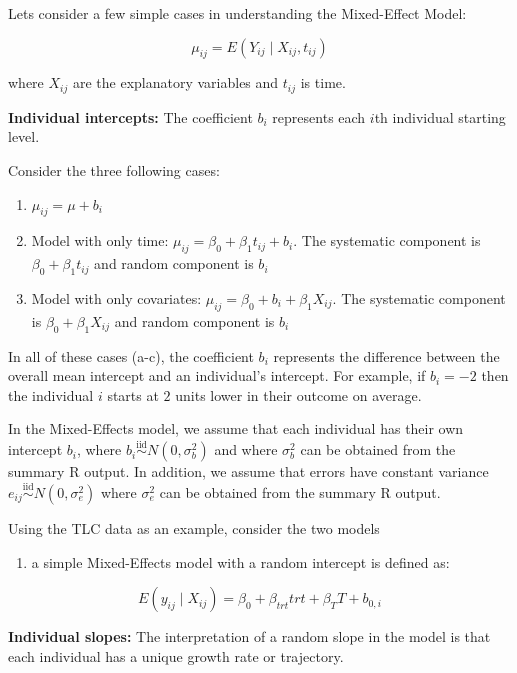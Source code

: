 \documentclass[
  letterpaper,
  DIV=11,
  numbers=noendperiod]{scrreprt}
\providecommand{\tightlist}{%
  \setlength{\itemsep}{0pt}\setlength{\parskip}{0pt}}\usepackage{longtable,booktabs,array}
\begin{document}
Lets consider a few simple cases in understanding the Mixed-Effect
Model:

\[\mu_{ij} = E(Y_{ij} \mid {X_{ij},t_{ij}})\]

where \(X_{ij}\) are the explanatory variables and \(t_{ij}\) is time.

\textbf{Individual intercepts:} The coefficient \(b_i\) represents each
\(i\)th individual starting level.

Consider the three following cases:

\begin{enumerate}
\def\labelenumi{\alph{enumi})}
\item
  \(\mu_{ij} = \mu + b_i\)
\item
  Model with only time: \(\mu_{ij} = \beta_0 + \beta_1 t_{ij} + b_i\).
  The systematic component is \(\beta_0 + \beta_1 t_{ij}\) and random
  component is \(b_i\)
\item
  Model with only covariates:
  \(\mu_{ij} = \beta_0 + b_i + \beta_1 X_{ij}\). The systematic
  component is \(\beta_0 + \beta_1 X_{ij}\) and random component is
  \(b_i\)
\end{enumerate}

In all of these cases (a-c), the coefficient \(b_i\) represents the
difference between the overall mean intercept and an individual's
intercept. For example, if \(b_i = -2\) then the individual \(i\) starts
at \(2\) units lower in their outcome on average.

In the Mixed-Effects model, we assume that each individual has their own
intercept \(b_i\), where
\(b_i \overset{\text{iid}}{\sim} N(0,\sigma^2_b)\) and where
\(\sigma^2_b\) can be obtained from the summary R output. In addition,
we assume that errors have constant variance
\(e_{ij} \overset{\text{iid}}{\sim} N(0,\sigma^2_e)\) where
\(\sigma^2_e\) can be obtained from the summary R output.

Using the TLC data as an example, consider the two models

\begin{enumerate}
\def\labelenumi{\arabic{enumi})}
\tightlist
\item
  a simple Mixed-Effects model with a random intercept is defined as:
\end{enumerate}

\[E(y_{ij} \mid X_{ij}) = \beta_0 +  \beta_{trt}trt +  \beta_{T}T + b_{0,i}\]

\textbf{Individual slopes:} The interpretation of a random slope in the
model is that each individual has a unique growth rate or trajectory.
\end{document}
